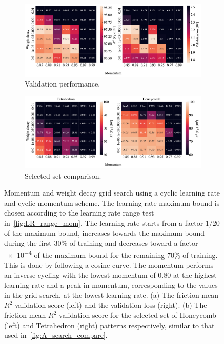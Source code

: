 \begin{figure}[!htb]
  \centering
  \begin{subfigure}[t]{1.0\textwidth}
      \centering
      \includegraphics[width=\textwidth]{figures/ML/mom_weight_search_cyclic_perf.pdf}
      \caption{Validation performance.}
  \end{subfigure}
  \hfill
  \begin{subfigure}[t]{1.0\textwidth}
      \centering
      \includegraphics[width=\textwidth]{figures/ML/mom_weight_search_compare_cyclic_perf.pdf}
      \caption{Selected set comparison.}
  \end{subfigure}
  \hfill
  \caption{Momentum and weight decay grid search using a cyclic learning rate and cyclic momentum scheme. The learning rate maximum bound is chosen according to the learning rate range test in~\cref{fig:LR_range_mom}. The learning rate starts from a factor $1/20$ of the maximum bound, increases towards the maximum bound during the first $30\%$ of training and decreases toward a factor \num{e-4} of the maximum bound for the remaining 70\% of training. This is done by following a cosine curve. The momentum performs an inverse cycling with the lowest momentum of 0.80 at the highest learning rate and a peak in momentum, corresponding to the values in the grid search, at the lowest learning rate. (a) The friction mean $R^2$ validation score (left) and the validation loss (right). (b) The friction mean $R^2$ validation score for the selected set of Honeycomb (left) and Tetrahedron (right) patterns respectively, similar to that used in~\cref{fig:A_search_compare}.}
  \label{fig:mom_weight_search_cyclic}
\end{figure}

